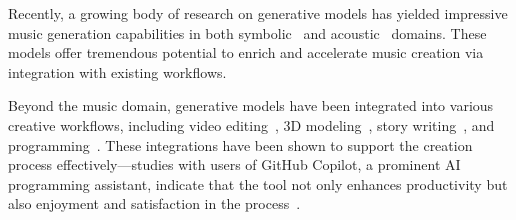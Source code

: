 \documentclass{article}
\newcommand{\slwu}[1]{{\color{orange}[SL: #1]}}
\begin{document}




\noindent
Recently, a growing body of research on generative models has 
yielded 
impressive music generation capabilities in both
symbolic~\cite{simon2017performance,huang2018music,donahue2019lakhnes,payne2019musenet,thickstun2023anticipatory,wu2023compose} and acoustic~\cite{oord2016wavenet,dieleman2018challenge,dhariwal2020jukebox,forsgren2022riffusion,agostinelli2023musiclm,donahue2023singsong,copet2024simple,wu2023music} domains. 
These models offer tremendous potential to enrich and accelerate music creation via integration with existing workflows.


Beyond the music domain, generative models have been integrated into various creative workflows, including video editing~\cite{wang2024lave}, 3D modeling~\cite{liu20233dalle}, story writing~\cite{wordcraft}, and programming~\cite{mcnutt2023design}. 
These integrations have been shown to support the creation process effectively---studies with users of GitHub Copilot, a prominent AI programming assistant, indicate that the tool not only enhances productivity but also enjoyment and satisfaction in the process~\cite{kalliamvakou2022copilot}.
\end{document}
